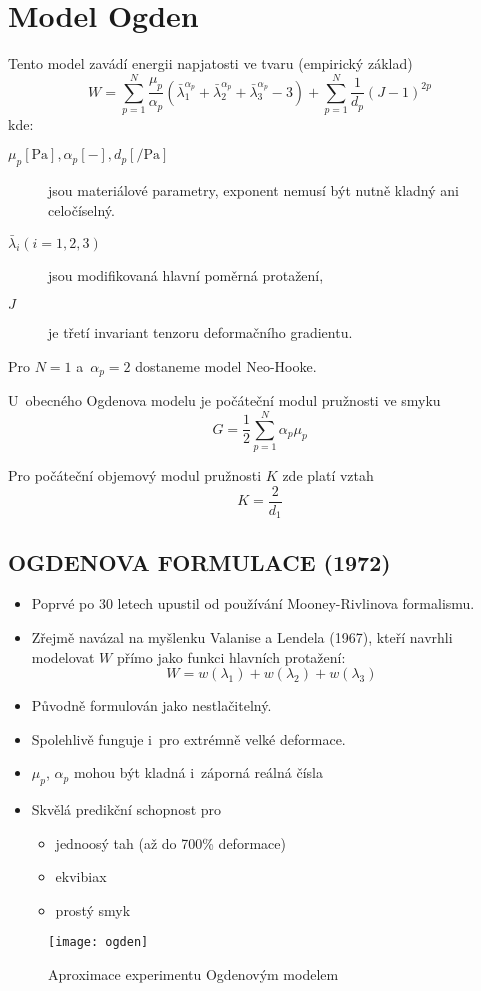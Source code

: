 
\section{Model Ogden}
Tento model zavádí energii napjatosti ve tvaru (empirický základ)
\begin{equation}
	W = \sum\limits_{p=1}^N \frac{\mu_p}{\alpha_p} \left(\bar{\lambda}_1^{\alpha_p} + \bar{\lambda}_2^{\alpha_p} + \bar{\lambda}_3^{\alpha_p} - 3\right)
	+ \sum\limits_{p=1}^N \frac{1}{d_p} \left(J - 1\right)^{2p}
\end{equation}
kde:
\begin{description}
	\item[{$\mu_p [\si{\pascal}], \alpha_p [-], d_p [\si{\per\pascal}]$}] jsou materiálové parametry, exponent nemusí být nutně kladný ani celočíselný.
	\item[$\bar{\lambda}_i (i=1,2,3)$] jsou modifikovaná hlavní poměrná protažení, 
	\item[$J$] je třetí invariant tenzoru deformačního gradientu.
\end{description}

Pro $N = 1$ a~$\alpha_p = 2$ dostaneme model Neo-Hooke.

U~obecného Ogdenova modelu je počáteční modul pružnosti ve smyku
\begin{equation}
	G = \frac{1}{2} \sum\limits_{p=1}^N \alpha_p \mu_p
\end{equation}

Pro počáteční objemový modul pružnosti $K$ zde platí vztah
\begin{equation}
	K = \frac{2}{d_1}
\end{equation}

\subsection{OGDENOVA FORMULACE (1972)}
\begin{itemize}
	\item Poprvé po 30 letech upustil od používání Mooney-Rivlinova formalismu.
	\item Zřejmě navázal na myšlenku Valanise a Lendela (1967), kteří navrhli modelovat $W$ přímo jako funkci hlavních protažení:
	\begin{equation}
		W = w(\lambda_1) + w(\lambda_2) + w(\lambda_3)
	\end{equation}
	\item Původně formulován jako nestlačitelný.
	\item Spolehlivě funguje i~pro extrémně velké deformace.
	\item $\mu_p$, $\alpha_p$ mohou být kladná i~záporná reálná čísla
	\item Skvělá predikční schopnost pro
	\begin{itemize}
		\item jednoosý tah (až do 700\% deformace)
		\item ekvibiax
		\item prostý smyk
	\end{itemize}
\end{itemize}

\begin{figure}[H]
	\centering
	\texttt{[image: ogden]}
	\caption{Aproximace experimentu Ogdenovým modelem}
	\label{fig:ogden}
\end{figure}
